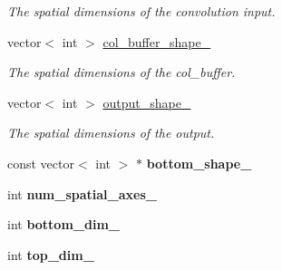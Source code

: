 \begin{DoxyCompactItemize}
\begin{DoxyCompactList}\small\item\em The spatial dimensions of the convolution input. \end{DoxyCompactList}\item 
vector$<$ int $>$ \hyperlink{classcaffe_1_1BaseConvolutionLayer_a9dd3f4ea6e17fe155efe537c120a3de4}{col\+\_\+buffer\+\_\+shape\+\_\+}\hypertarget{classcaffe_1_1BaseConvolutionLayer_a9dd3f4ea6e17fe155efe537c120a3de4}{}\label{classcaffe_1_1BaseConvolutionLayer_a9dd3f4ea6e17fe155efe537c120a3de4}

\begin{DoxyCompactList}\small\item\em The spatial dimensions of the col\+\_\+buffer. \end{DoxyCompactList}\item 
vector$<$ int $>$ \hyperlink{classcaffe_1_1BaseConvolutionLayer_af0892b61454ba086c4c74b78d910bf31}{output\+\_\+shape\+\_\+}\hypertarget{classcaffe_1_1BaseConvolutionLayer_af0892b61454ba086c4c74b78d910bf31}{}\label{classcaffe_1_1BaseConvolutionLayer_af0892b61454ba086c4c74b78d910bf31}

\begin{DoxyCompactList}\small\item\em The spatial dimensions of the output. \end{DoxyCompactList}\item 
const vector$<$ int $>$ $\ast$ {\bfseries bottom\+\_\+shape\+\_\+}\hypertarget{classcaffe_1_1BaseConvolutionLayer_a8a91469895adc7114eecee92bb4f81a1}{}\label{classcaffe_1_1BaseConvolutionLayer_a8a91469895adc7114eecee92bb4f81a1}

\item 
int {\bfseries num\+\_\+spatial\+\_\+axes\+\_\+}\hypertarget{classcaffe_1_1BaseConvolutionLayer_a8eac7ce95d86d01f026b649787a1920b}{}\label{classcaffe_1_1BaseConvolutionLayer_a8eac7ce95d86d01f026b649787a1920b}

\item 
int {\bfseries bottom\+\_\+dim\+\_\+}\hypertarget{classcaffe_1_1BaseConvolutionLayer_af5a73bde5834135df30eb2649bd510cb}{}\label{classcaffe_1_1BaseConvolutionLayer_af5a73bde5834135df30eb2649bd510cb}

\item 
int {\bfseries top\+\_\+dim\+\_\+}\hypertarget{classcaffe_1_1BaseConvolutionLayer_a2221107608862f0a81a97f87363967ec}{}\label{classcaffe_1_1BaseConvolutionLayer_a2221107608862f0a81a97f87363967ec}


\end{DoxyCompactItemize}
